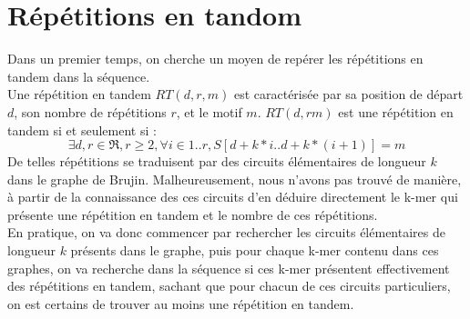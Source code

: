 \documentclass{article}
\begin{document}
\section{Répétitions en tandom}
Dans un premier temps, on cherche un moyen de repérer les répétitions en tandem dans la séquence.\\
Une répétition en tandem $RT(d, r, m)$ est caractérisée par sa position de départ $d$, son nombre de répétitions $r$, et le motif $m$.
$RT(d,rm)$ est une répétition en tandem si et seulement si :
\[
\exists d,r \in \Re, r \ge 2, \forall i \in {1..r}, S[d+k*i..d+k*(i+1)] = m
\]
De telles répétitions se traduisent par des circuits élémentaires de longueur $k$ dans le graphe de Brujin. Malheureusement, nous n'avons pas trouvé de manière, à partir de la connaissance des ces circuits d'en déduire directement le k-mer qui présente une répétition en tandem et le nombre de ces répétitions.\\
En pratique, on va donc commencer par rechercher les circuits élémentaires de longueur $k$ présents dans le graphe, puis pour chaque k-mer contenu dans ces graphes, on va recherche dans la séquence si ces k-mer présentent effectivement des répétitions en tandem, sachant que pour chacun de ces circuits particuliers, on est certains de trouver au moins une répétition en tandem.
\end{document}
